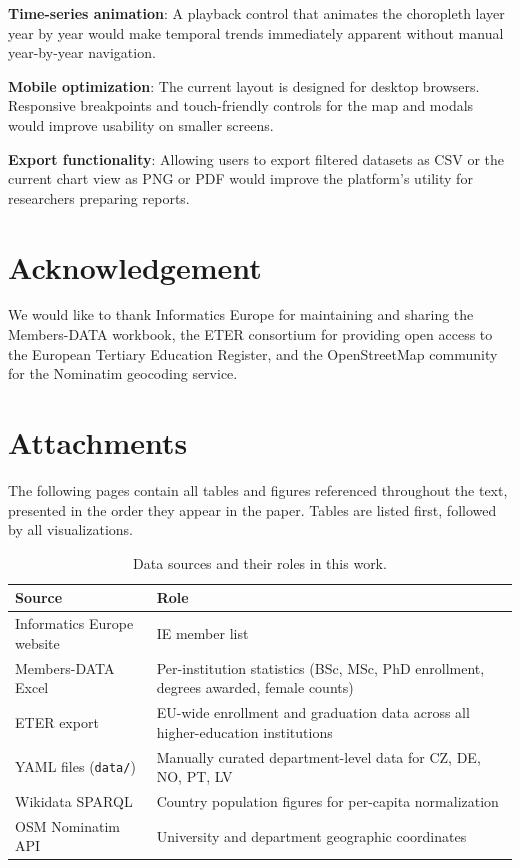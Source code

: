 \documentclass[final,3p,times,twocolumn]{elsarticle}
\begin{document}
\textbf{Time-series animation}: A playback control that animates the choropleth layer year by year would make temporal trends immediately apparent without manual year-by-year navigation.

\textbf{Mobile optimization}: The current layout is designed for desktop browsers. Responsive breakpoints and touch-friendly controls for the map and modals would improve usability on smaller screens.

\textbf{Export functionality}: Allowing users to export filtered datasets as CSV or the current chart view as PNG or PDF would improve the platform's utility for researchers preparing reports.

\section*{Acknowledgement}

We would like to thank Informatics Europe for maintaining and sharing the Members-DATA workbook, the ETER consortium for providing open access to the European Tertiary Education Register, and the OpenStreetMap community for the Nominatim geocoding service.




\newpage
\section*{Attachments}

The following pages contain all tables and figures referenced throughout the text, presented in the order they appear in the paper. Tables are listed first, followed by all visualizations.

\begin{table}[htbp]
\caption{Data sources and their roles in this work.}
\label{tab:sources}
\begin{tabularx}{\textwidth}{lX}
\hline
\textbf{Source} & \textbf{Role} \\
\hline
Informatics Europe website & IE member list \\
Members-DATA Excel & Per-institution statistics (BSc, MSc, PhD enrollment, degrees awarded, female counts) \\
ETER export & EU-wide enrollment and graduation data across all higher-education institutions \\
YAML files (\texttt{data/}) & Manually curated department-level data for CZ, DE, NO, PT, LV \\
Wikidata SPARQL & Country population figures for per-capita normalization \\
OSM Nominatim API & University and department geographic coordinates \\
\hline
\end{tabularx}
\end{table}
\end{document}
